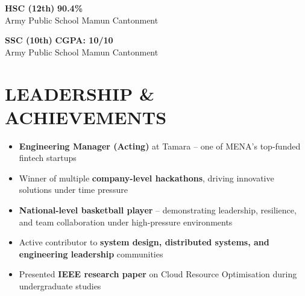 \documentclass[a4paper,11pt]{article}
\begin{document}
\vspace{4pt}

\noindent
\textbf{HSC (12th)} \hfill \textbf{90.4\%} \\
Army Public School Mamun Cantonment

\vspace{4pt}

\noindent
\textbf{SSC (10th)} \hfill \textbf{CGPA: 10/10} \\
Army Public School Mamun Cantonment


\section*{LEADERSHIP \& ACHIEVEMENTS}

\begin{itemize}
\item \textbf{Engineering Manager (Acting)} at Tamara -- one of MENA's top-funded fintech startups
\item Winner of multiple \textbf{company-level hackathons}, driving innovative solutions under time pressure
\item \textbf{National-level basketball player} -- demonstrating leadership, resilience, and team collaboration under high-pressure environments
\item Active contributor to \textbf{system design, distributed systems, and engineering leadership} communities
\item Presented \textbf{IEEE research paper} on Cloud Resource Optimisation during undergraduate studies
\end{itemize}
\end{document}
